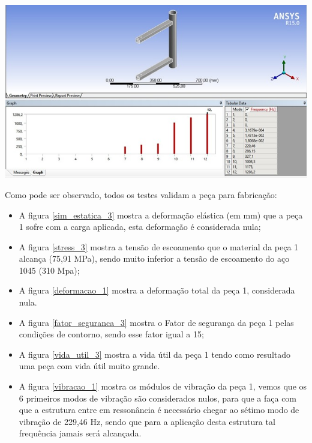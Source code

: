     \begin{center}
    	\includegraphics[scale=0.7]{figuras/vibracao_1}
        \label{vibracao_1}
    \end{center}    
 
    Como pode ser observado, todos os testes validam a peça para fabricação:
    \begin{itemize}
        \item A figura \ref{sim_estatica_3} mostra a deformação elástica (em mm) que a peça 1 sofre com a carga aplicada, esta deformação é considerada nula;
        \item A figura \ref{stress_3} mostra a tensão de escoamento que o material da peça 1 alcança (75,91 MPa), sendo muito inferior a tensão de escoamento do aço 1045 (310 Mpa);
        \item A figura \ref{deformacao_1} mostra a deformação total da peça 1, considerada nula.
        \item A figura \ref{fator_seguranca_3} mostra o Fator de segurança da peça 1 pelas condições de contorno, sendo esse fator igual a 15;
        \item A figura \ref{vida_util_3} mostra a vida útil da peça 1 tendo como resultado uma peça com vida útil muito grande.
        \item A figura \ref{vibracao_1} mostra os módulos de vibração da peça 1, vemos que os 6 primeiros modos de vibração são considerados nulos, para que a faça com que a estrutura entre em ressonância é necessário chegar ao sétimo modo de vibração de 229,46 Hz, sendo que para a aplicação desta estrutura tal frequência jamais será alcançada.
    \end{itemize}
    
